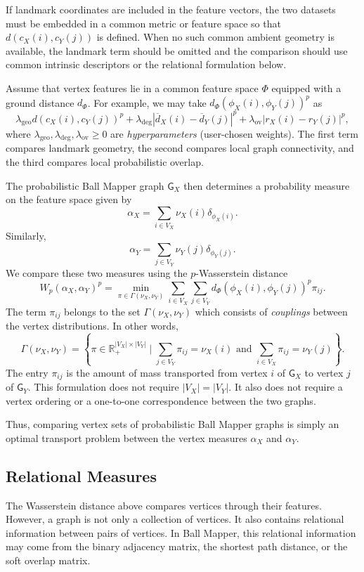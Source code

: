 \documentclass[9pt,a4paper,twocolumn,twoside]{extarticle}
\theoremstyle{definition}
\begin{document}
If landmark coordinates are included in the feature vectors, the two datasets must be embedded in a common metric or feature space so that $d(c_X(i),c_Y(j))$ is defined.  When no such common ambient geometry is available, the landmark term should be omitted and the comparison should use common intrinsic descriptors or the relational formulation below. 

Assume that vertex features lie in a common feature space $\Phi$ equipped with a ground distance $d_\Phi$. For example, we may take $d_\Phi(\phi_X(i),\phi_Y(j))^p$ as
\[
\lambda_{\mathrm{geo}}d(c_X(i),c_Y(j))^p + \lambda_{\mathrm{deg}}|\overline d_X(i)-\overline d_Y(j)|^p + \lambda_{\mathrm{ov}}|r_X(i)-r_Y(j)|^p,
\]
where $\lambda_{\mathrm{geo}},\lambda_{\mathrm{deg}},\lambda_{\mathrm{ov}}\ge 0$ are \emph{hyperparameters} (user-chosen weights). The first term compares landmark geometry, the second compares local graph connectivity, and the third compares local probabilistic overlap.

The probabilistic Ball Mapper graph $\mathsf G_X$ then determines a probability measure on the feature space given by
\[
\alpha_X = \sum_{i\in V_X}\nu_X(i)\delta_{\phi_X(i)}.
\]
Similarly,
\[
\alpha_Y =\sum_{j\in V_Y}\nu_Y(j)\delta_{\phi_Y(j)}.
\]
We compare these two measures using the $p$-Wasserstein distance \cite{santambrogio2015optimal}
\[
W_p(\alpha_X,\alpha_Y)^p =\min_{\pi\in\Gamma(\nu_X,\nu_Y)}\sum_{i\in V_X}\sum_{j\in V_Y} d_\Phi(\phi_X(i),\phi_Y(j))^p\pi_{ij}.
\]
The term $\pi_{ij}$ belongs to the set $\Gamma(\nu_X,\nu_Y)$ which consists of \emph{couplings} between the vertex distributions. In other words,
\[
\Gamma(\nu_X,\nu_Y) = \left\{\pi\in\mathbb R_+^{|V_X|\times |V_Y|} \mid \sum_{j\in V_Y}\pi_{ij}=\nu_X(i) \text{ and } \sum_{i\in V_X}\pi_{ij}=\nu_Y(j)\right\}.
\]
The entry $\pi_{ij}$ is the amount of mass transported from vertex $i$ of $\mathsf G_X$ to vertex $j$ of $\mathsf G_Y$. This formulation does not require $|V_X|=|V_Y|$. It also does not require a vertex ordering or a one-to-one correspondence between the two graphs.

Thus, comparing vertex sets of probabilistic Ball Mapper graphs is simply an optimal transport problem between the vertex measures $\alpha_X$ and $\alpha_Y$.

\subsection{Relational Measures}

The Wasserstein distance above compares vertices through their features. However, a graph is not only a collection of vertices. It also contains relational information between pairs of vertices. In Ball Mapper, this relational information may come from the binary adjacency matrix, the shortest path distance, or the soft overlap matrix.
\end{document}

